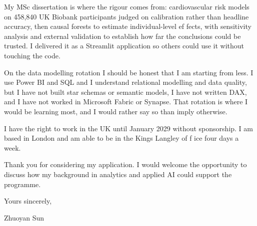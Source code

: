 \documentclass[letterpaper,11pt]{article}
\begin{document}
My MSc dissertation is where the rigour comes from: cardiovascular risk models on 458,840 UK Biobank participants judged on calibration rather than headline accuracy, then causal forests to estimate individual-level ef\kern0pt fects, with sensitivity analysis and external validation to establish how far the conclusions could be trusted. I delivered it as a Streamlit application so others could use it without touching the code.

On the data modelling rotation I should be honest that I am starting from less. I use Power BI and SQL and I understand relational modelling and data quality, but I have not built star schemas or semantic models, I have not written DAX, and I have not worked in Microsoft Fabric or Synapse. That rotation is where I would be learning most, and I would rather say so than imply otherwise.

I have the right to work in the UK until January 2029 without sponsorship. I am based in London and am able to be in the Kings Langley of\kern0pt f\kern0pt ice four days a week.

Thank you for considering my application. I would welcome the opportunity to discuss how my background in analytics and applied AI could support the programme.

\vspace{2pt}
Yours sincerely,

\vspace{8pt}
Zhuoyan Sun
\end{document}
